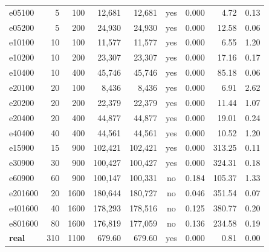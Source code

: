 \documentclass[11pt,a4paper]{article}
\begin{document}
\begin{table}[H]
\begin{tabular}{l r r r r c r r r}
\midrule
e05100 & 5 & 100 & 12,681 & 12,681 & yes & 0.000 & 4.72 & 0.13 \\
e05200 & 5 & 200 & 24,930 & 24,930 & yes & 0.000 & 12.58 & 0.06 \\
e10100 & 10 & 100 & 11,577 & 11,577 & yes & 0.000 & 6.55 & 1.20 \\
e10200 & 10 & 200 & 23,307 & 23,307 & yes & 0.000 & 17.16 & 0.17 \\
e10400 & 10 & 400 & 45,746 & 45,746 & yes & 0.000 & 85.18 & 0.06 \\
e20100 & 20 & 100 & 8,436 & 8,436 & yes & 0.000 & 6.91 & 2.62 \\
e20200 & 20 & 200 & 22,379 & 22,379 & yes & 0.000 & 11.44 & 1.07 \\
e20400 & 20 & 400 & 44,877 & 44,877 & yes & 0.000 & 19.01 & 0.24 \\
e40400 & 40 & 400 & 44,561 & 44,561 & yes & 0.000 & 10.52 & 1.20 \\
e15900 & 15 & 900 & 102,421 & 102,421 & yes & 0.000 & 313.25 & 0.11 \\
e30900 & 30 & 900 & 100,427 & 100,427 & yes & 0.000 & 324.31 & 0.18 \\
e60900 & 60 & 900 & 100,147 & 100,331 & no & 0.184 & 105.37 & 1.33 \\
e201600 & 20 & 1600 & 180,644 & 180,727 & no & 0.046 & 351.54 & 0.07 \\
e401600 & 40 & 1600 & 178,293 & 178,516 & no & 0.125 & 380.77 & 0.20 \\
e801600 & 80 & 1600 & 176,819 & 177,059 & no & 0.136 & 234.58 & 0.19 \\
\midrule
\textbf{real} & 310 & 1100 & 679.60 & 679.60 & yes & 0.000 & 0.81 & 0.00 \\
\bottomrule
\end{tabular}
\end{table}
\end{document}
